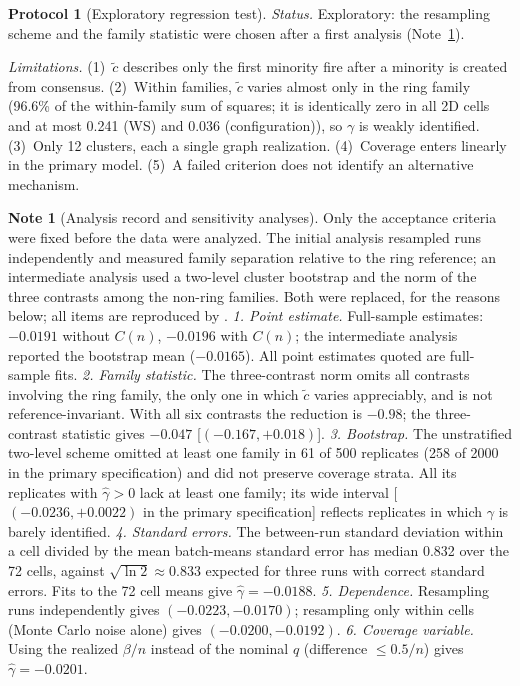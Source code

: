 \documentclass[aps,pre,onecolumn,superscriptaddress,amsmath,amssymb,longbibliography]{revtex4-2}
\theoremstyle{definition}
\newtheorem{protocol}[theorem]{Protocol}
\newtheorem{note}[theorem]{Note}
\theoremstyle{remark}
\newcommand{\ctil}{\tilde c}
\begin{document}
\begin{protocol}[Exploratory regression test]
\emph{Status.} Exploratory: the resampling scheme and the family
statistic were chosen after a first analysis (Note~\ref{note:record}).

\emph{Limitations.} (1)~$\ctil$ describes only the first minority fire
after a minority is created from consensus. (2)~Within families, $\ctil$
varies almost only in the ring family (96.6\% of the within-family sum
of squares; it is identically zero in all 2D cells and at most 0.241
(WS) and 0.036 (configuration)), so $\gamma$ is weakly identified.
(3)~Only 12 clusters, each a single graph realization. (4)~Coverage
enters linearly in the primary model. (5)~A failed criterion does not
identify an alternative mechanism.
\end{protocol}

\begin{note}[Analysis record and sensitivity analyses]
\label{note:record}
Only the acceptance criteria were fixed before the data were analyzed.
The initial analysis resampled runs independently and measured family
separation relative to the ring reference; an intermediate analysis used
a two-level cluster bootstrap and the norm of the three contrasts among
the non-ring families. Both were replaced, for the reasons below; all
items are reproduced by .
\emph{1. Point estimate.} Full-sample estimates: $-0.0191$ without
$C(n)$, $-0.0196$ with $C(n)$; the intermediate analysis reported the
bootstrap mean ($-0.0165$). All point estimates quoted are full-sample
fits.
\emph{2. Family statistic.} The three-contrast norm omits all contrasts
involving the ring family, the only one in which $\ctil$ varies
appreciably, and is not reference-invariant. With all six contrasts the
reduction is $-0.98$; the three-contrast statistic gives $-0.047$
[$(-0.167,+0.018)$].
\emph{3. Bootstrap.} The unstratified two-level scheme omitted at least
one family in 61 of 500 replicates (258 of 2000 in the primary
specification) and did not preserve coverage strata. All its replicates
with $\hat\gamma>0$ lack at least one family; its wide interval
[$(-0.0236,+0.0022)$ in the primary specification] reflects replicates
in which $\gamma$ is barely identified.
\emph{4. Standard errors.} The between-run standard deviation within a
cell divided by the mean batch-means standard error has median 0.832 over
the 72 cells, against $\sqrt{\ln2}\approx0.833$ expected for three runs
with correct standard errors. Fits to the 72 cell means give
$\hat\gamma=-0.0188$.
\emph{5. Dependence.} Resampling runs independently gives
$(-0.0223,-0.0170)$; resampling only within cells (Monte Carlo noise
alone) gives $(-0.0200,-0.0192)$.
\emph{6. Coverage variable.} Using the realized $\beta/n$ instead of the
nominal $q$ (difference $\le0.5/n$) gives $\hat\gamma=-0.0201$.
\end{note}
\end{document}
